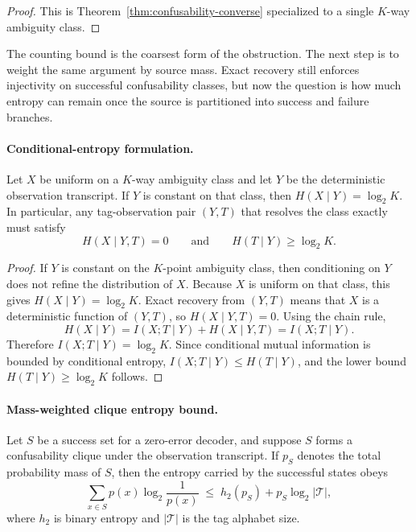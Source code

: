 \begin{proof}
This is Theorem~\ref{thm:confusability-converse} specialized to a single $K$-way ambiguity class.
\end{proof}

The counting bound is the coarsest form of the obstruction. The next step is to weight the same argument by source mass. Exact recovery still enforces injectivity on successful confusability classes, but now the question is how much entropy can remain once the source is partitioned into success and failure branches.

\paragraph{Conditional-entropy formulation.}
Let $X$ be uniform on a $K$-way ambiguity class and let $Y$ be the deterministic observation transcript. If $Y$ is constant on that class, then $H(X\mid Y)=\log_2 K$. In particular, any tag-observation pair $(Y,T)$ that resolves the class exactly must satisfy
\[
H(X\mid Y,T)=0
\qquad\text{and}\qquad
H(T\mid Y)\ge \log_2 K .
\] 

\begin{proof}
If $Y$ is constant on the $K$-point ambiguity class, then conditioning on $Y$ does not refine the distribution of $X$. Because $X$ is uniform on that class, this gives $H(X\mid Y)=\log_2 K$. Exact recovery from $(Y,T)$ means that $X$ is a deterministic function of $(Y,T)$, so $H(X\mid Y,T)=0$. Using the chain rule,
\[
H(X\mid Y)=I(X;T\mid Y)+H(X\mid Y,T)=I(X;T\mid Y).
\]
Therefore $I(X;T\mid Y)=\log_2 K$. Since conditional mutual information is bounded by conditional entropy, $I(X;T\mid Y)\le H(T\mid Y)$, and the lower bound $H(T\mid Y)\ge \log_2 K$ follows.
\end{proof}

\paragraph{Mass-weighted clique entropy bound.}
Let $S$ be a success set for a zero-error decoder, and suppose $S$ forms a confusability clique under the observation transcript. If $p_S$ denotes the total probability mass of $S$, then the entropy carried by the successful states obeys
\[
\sum_{x\in S} p(x)\log_2 \frac{1}{p(x)}
\;\le\;
h_2(p_S) + p_S \log_2 |\mathcal T|,
\]
where $h_2$ is binary entropy and $|\mathcal T|$ is the tag alphabet size. 

